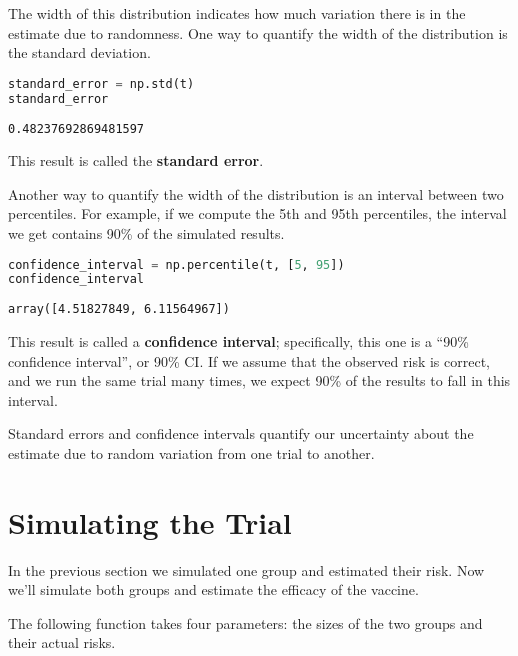 The width of this distribution indicates how much variation there is in
the estimate due to randomness. One way to quantify the width of the
distribution is the standard deviation.

\begin{lstlisting}[language=Python,style=source]
standard_error = np.std(t)
standard_error
\end{lstlisting}

\begin{lstlisting}[style=output]
0.48237692869481597
\end{lstlisting}

This result is called the \textbf{standard error}.

Another way to quantify the width of the distribution is an interval
between two percentiles. For example, if we compute the 5th and 95th
percentiles, the interval we get contains 90\% of the simulated results.

\begin{lstlisting}[language=Python,style=source]
confidence_interval = np.percentile(t, [5, 95])
confidence_interval
\end{lstlisting}

\begin{lstlisting}[style=output]
array([4.51827849, 6.11564967])
\end{lstlisting}

This result is called a \textbf{confidence interval}; specifically, this
one is a ``90\% confidence interval'', or 90\% CI. If we assume that the
observed risk is correct, and we run the same trial many times, we
expect 90\% of the results to fall in this interval.

Standard errors and confidence intervals quantify our uncertainty about
the estimate due to random variation from one trial to another.

\section{Simulating the Trial}\label{simulating-the-trial}

In the previous section we simulated one group and estimated their risk.
Now we'll simulate both groups and estimate the efficacy of the vaccine.

The following function takes four parameters: the sizes of the two
groups and their actual risks.

